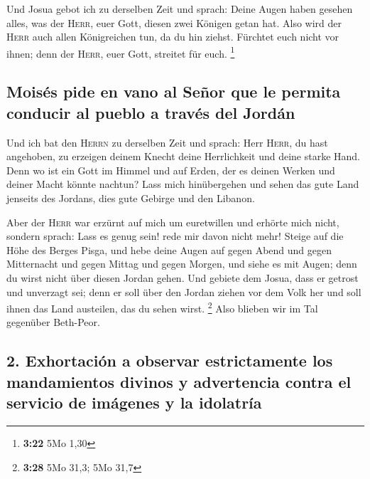  Und Josua gebot ich zu derselben Zeit und sprach: Deine
Augen haben gesehen alles, was der \textsc{Herr}, euer Gott, diesen zwei
Königen getan hat. Also wird der \textsc{Herr} auch allen Königreichen
tun, da du hin ziehst.  Fürchtet euch nicht vor ihnen;
denn der \textsc{Herr}, euer Gott, streitet für euch. \footnote{\textbf{3:22}
  5Mo 1,30}

\hypertarget{moisuxe9s-pide-en-vano-al-seuxf1or-que-le-permita-conducir-al-pueblo-a-travuxe9s-del-jorduxe1n}{%
\subsection{Moisés pide en vano al Señor que le permita conducir al
pueblo a través del
Jordán}\label{moisuxe9s-pide-en-vano-al-seuxf1or-que-le-permita-conducir-al-pueblo-a-travuxe9s-del-jorduxe1n}}

 Und ich bat den \textsc{Herrn} zu derselben Zeit und
sprach:  Herr \textsc{Herr}, du hast angehoben, zu
erzeigen deinem Knecht deine Herrlichkeit und deine starke Hand. Denn wo
ist ein Gott im Himmel und auf Erden, der es deinen Werken und deiner
Macht könnte nachtun?  Lass mich hinübergehen und sehen
das gute Land jenseits des Jordans, dies gute Gebirge und den Libanon.

 Aber der \textsc{Herr} war erzürnt auf mich um
euretwillen und erhörte mich nicht, sondern sprach: Lass es genug sein!
rede mir davon nicht mehr!  Steige auf die Höhe des
Berges Pisga, und hebe deine Augen auf gegen Abend und gegen Mitternacht
und gegen Mittag und gegen Morgen, und siehe es mit Augen; denn du wirst
nicht über diesen Jordan gehen.  Und gebiete dem Josua,
dass er getrost und unverzagt sei; denn er soll über den Jordan ziehen
vor dem Volk her und soll ihnen das Land austeilen, das du sehen wirst.
\footnote{\textbf{3:28} 5Mo 31,3; 5Mo 31,7}  Also blieben
wir im Tal gegenüber Beth-Peor.

\hypertarget{exhortaciuxf3n-a-observar-estrictamente-los-mandamientos-divinos-y-advertencia-contra-el-servicio-de-imuxe1genes-y-la-idolatruxeda}{%
\subsection{2. Exhortación a observar estrictamente los mandamientos
divinos y advertencia contra el servicio de imágenes y la
idolatría}\label{exhortaciuxf3n-a-observar-estrictamente-los-mandamientos-divinos-y-advertencia-contra-el-servicio-de-imuxe1genes-y-la-idolatruxeda}}

